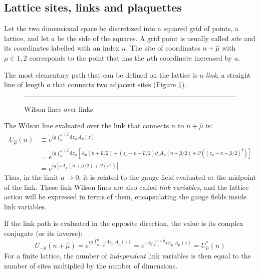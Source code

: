 \subsection*{Lattice sites, links and plaquettes}
Let the two dimensional space be discretized into a squared grid of points, \ie a lattice, and let $a$ be the side of the squares.
A grid point is usually called \emph{site} and its coordinates labelled with an index $n$.
The site of coordinates $n + \hat\mu$ with $\mu \in {1,2}$ corresponds to the point that has the $\mu$th coordinate increased by $a$.

The most elementary path that can be defined on the lattice is a \emph{link},
\ie a straight line of length $a$ that connects two adjacent sites (Figure \ref{fig:links}).
\begin{figure}[!htb]
    \centering
    \rule{3in}{1.5in}
    \caption{Wilson lines over links}
    \label{fig:links}
\end{figure}
The Wilson line evaluated over the link that connects $n$ to $n+\hat\mu$ is:
\begin{equation}\label{eq:link}
    \begin{aligned}
        U_{\hat\mu}(n) &\equiv e^{ig\int_n^{n+\hat\mu}\mathrm dz_\mu\,A_\mu(z)} \\
                       &= e^{ig\int_n^{n+\hat\mu}\mathrm dz_\mu\,\left[A_\mu(n+\hat\mu/2) + (z_\mu-n-\hat\mu/2)\partial_\mu A_\mu(n+\hat\mu/2)%
                                                                                     + \mathcal O\left((z_\mu-n-\hat\mu/2)^2\right)\right]} \\
                       &= e^{ig\left[aA_\mu(n+\hat\mu/2) + \mathcal O\left(a^3\right)\right]}
    \end{aligned}
\end{equation}
Thus, in the limit $a \to 0$, it is related to the gauge field evaluated at the midpoint of the link.
These link Wilson lines are also called \emph{link variables}, and the lattice action will be expressed in terms of them,
encapsulating the gauge fields inside link variables.

If the link path is evaluated in the opposite direction, the value is its complex conjugate (or its inverse):
\[
    U_{-\hat\mu}(n+\hat\mu) = e^{ig\int^n_{n+\hat\mu}\mathrm dz_\mu\,A_\mu(z)} = e^{-ig\int_n^{n+\hat\mu}\mathrm dz_\mu\,A_\mu(z)} = U^*_{\hat\mu}(n)
\]
For a finite lattice, the number of \emph{independent} link variables is then equal to the number of sites multiplied by the number of dimensions.

